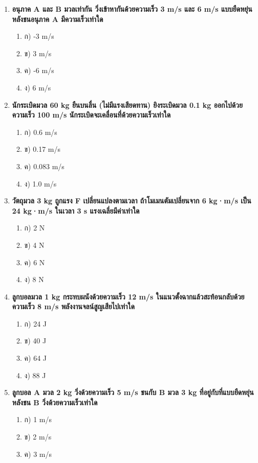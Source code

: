\documentclass[12pt]{article}
\begin{document}
\begin{enumerate}
\begin{enumerate}
\item ค) 3 m/s ในทิศรถ B เดิม
\item ง) 6 m/s ในทิศรถ A เดิม
\end{enumerate}
\item \textbf{อนุภาค A และ B มวลเท่ากัน วิ่งเข้าหากันด้วยความเร็ว 3 m/s และ 6 m/s แบบยืดหยุ่น หลังชนอนุภาค A มีความเร็วเท่าใด}
\begin{enumerate}
\item ก) -3 m/s
\item ข) 3 m/s
\item ค) -6 m/s
\item ง) 6 m/s
\end{enumerate}
\item \textbf{นักระเบิดมวล 60 kg ยืนบนลื่น (ไม่มีแรงเสียดทาน) ยิงระเบิดมวล 0.1 kg ออกไปด้วยความเร็ว 100 m/s นักระเบิดจะเคลื่อนที่ด้วยความเร็วเท่าใด}
\begin{enumerate}
\item ก) 0.6 m/s
\item ข) 0.17 m/s
\item ค) 0.083 m/s
\item ง) 1.0 m/s
\end{enumerate}
\item \textbf{วัตถุมวล 3 kg ถูกแรง F เปลี่ยนแปลงตามเวลา ถ้าโมเมนตัมเปลี่ยนจาก 6 kg·m/s เป็น 24 kg·m/s ในเวลา 3 s แรงเฉลี่ยมีค่าเท่าใด}
\begin{enumerate}
\item ก) 2 N
\item ข) 4 N
\item ค) 6 N
\item ง) 8 N
\end{enumerate}
\item \textbf{ลูกบอลมวล 1 kg กระทบผนังด้วยความเร็ว 12 m/s ในแนวตั้งฉากแล้วสะท้อนกลับด้วยความเร็ว 8 m/s พลังงานจลน์สูญเสียไปเท่าใด}
\begin{enumerate}
\item ก) 24 J
\item ข) 40 J
\item ค) 64 J
\item ง) 88 J
\end{enumerate}
\item \textbf{ลูกบอล A มวล 2 kg วิ่งด้วยความเร็ว 5 m/s ชนกับ B มวล 3 kg ที่อยู่กับที่แบบยืดหยุ่น หลังชน B วิ่งด้วยความเร็วเท่าใด}
\begin{enumerate}
\item ก) 1 m/s
\item ข) 2 m/s
\item ค) 3 m/s

\end{enumerate}
\end{enumerate}
\end{document}
